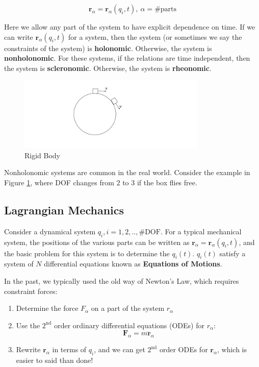 \[
    \mathbf{r}_\alpha = \mathbf{r}_\alpha(q_i, t),\ \alpha=\text{\# parts}
\]

Here we allow any part of the system to have explicit dependence on time. If we can write $\mathbf{r}_\alpha(q_i, t)$ for a system, then the system (or sometimes we say the constraints of the system) is \textbf{holonomic}. Otherwise, the system is  \textbf{nonholonomic}. For these systems, if the relations are time independent, then the system is \textbf{scleronomic}. Otherwise, the system is \textbf{rheonomic}. 

\begin{figure}[h]
  \centering
  \includegraphics[width=0.8\textwidth]{images/1-1-3.png}
  \caption{Rigid Body}
  \label{fig:1-1-3}
\end{figure}

Nonholonomic systems are common in the real world. Consider the example in Figure \ref{fig:1-1-3}, where DOF changes from $2$ to $3$ if the box flies free.

\subsection{Lagrangian Mechanics}

Consider a dynamical system $q_i, i=1,2,..,\text{\# DOF}$. For a typical mechanical system, the positions of the various parts can be written as $\mathbf{r}_\alpha=\mathbf{r}_\alpha(q_i, t)$, and the basic problem for this system is to determine the $q_i(t)$. $q_i(t)$ satisfy a system of $N$ differential equations known as \textbf{Equations of Motions}.

In the past, we typically used the old way of Newton's Law, which requires constraint forces:

\begin{enumerate}
    \item Determine the force $F_\alpha$ on a part of the system $r_\alpha$
    \item Use the $2^{\text{nd}}$ order ordinary differential equations (ODEs) for $r_\alpha$: 
    \[
        \mathbf{F}_\alpha = m \ddot{\mathbf{r}}_\alpha
    \]
    \item Rewrite $\mathbf{r}_\alpha$ in terms of $q_i$, and we can get $2^{\text{nd}}$ order ODEs for $\mathbf{r}_\alpha$, which is easier to said than done!
\end{enumerate}

